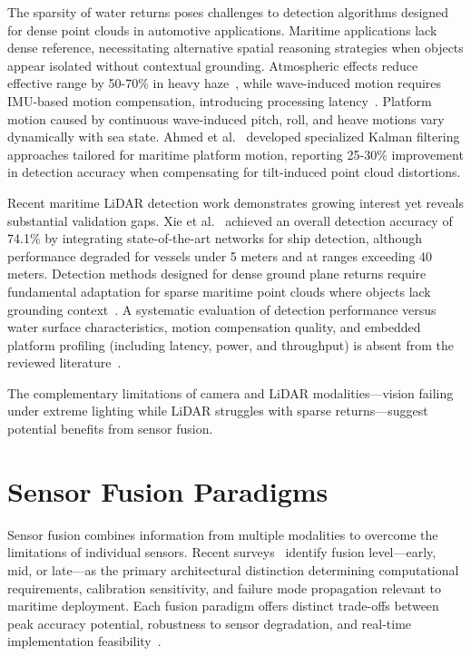 \documentclass{erauthesis}
\begin{document}
The sparsity of water returns poses challenges to detection algorithms designed for dense point clouds in automotive applications.
Maritime applications lack dense reference, necessitating alternative spatial reasoning strategies when objects appear isolated without contextual grounding.
Atmospheric effects reduce effective range by 50-70\% in heavy haze~\cite{roriz2022}, while wave-induced motion requires IMU-based motion compensation, introducing processing latency~\cite{xie2024, ahmed2024}.
Platform motion caused by continuous wave-induced pitch, roll, and heave motions vary dynamically with sea state.
Ahmed et al.~\cite{ahmed2024} developed specialized Kalman filtering approaches tailored for maritime platform motion, reporting 25-30\% improvement in detection accuracy when compensating for tilt-induced point cloud distortions.

Recent maritime \ac{LiDAR} detection work demonstrates growing interest yet reveals substantial validation gaps.
Xie et al.~\cite{xie2024} achieved an overall detection accuracy of 74.1\% by integrating state-of-the-art networks for ship detection, although performance degraded for vessels under 5 meters and at ranges exceeding 40 meters.
Detection methods designed for dense ground plane returns require fundamental adaptation for sparse maritime point clouds where objects lack grounding context~\cite{kunz2005}.
A systematic evaluation of detection performance versus water surface characteristics, motion compensation quality, and embedded platform profiling (including latency, power, and throughput) is absent from the reviewed literature~\cite{xie2024, ahmed2024}.

The complementary limitations of camera and \ac{LiDAR} modalities—vision failing under extreme lighting while LiDAR struggles with sparse returns—suggest potential benefits from sensor fusion.

\section{Sensor Fusion Paradigms}

Sensor fusion combines information from multiple modalities to overcome the limitations of individual sensors.
Recent surveys~\cite{feng2021, tufekci2023, huang2024a} identify fusion level—early, mid, or late—as the primary architectural distinction determining computational requirements, calibration sensitivity, and failure mode propagation relevant to maritime deployment.
Each fusion paradigm offers distinct trade-offs between peak accuracy potential, robustness to sensor degradation, and real-time implementation feasibility~\cite{feng2021}.
\end{document}
